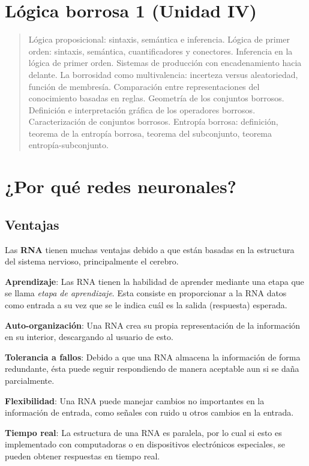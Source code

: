 \documentclass[10pt,a4paper]{article}
\begin{document}
\section*{Lógica borrosa 1 (Unidad IV)}
\begin{quote}
Lógica proposicional: sintaxis, semántica e inferencia. Lógica de primer orden: sintaxis, semántica, cuantificadores y conectores. Inferencia en la lógica de primer orden. Sistemas de producción con encadenamiento hacia delante. La borrosidad como multivalencia: incerteza versus aleatoriedad,  función de membresía. Comparación entre representaciones del conocimiento basadas en reglas. Geometría de los conjuntos borrosos. Definición e interpretación gráfica de los operadores borrosos. Caracterización de conjuntos borrosos. Entropía borrosa: definición, teorema de la entropía borrosa, teorema del subconjunto, teorema entropía-subconjunto.
\end{quote}

\pagebreak
\maketitle

\section{¿Por qué redes neuronales?}

\subsection{Ventajas}
Las \textbf{RNA} tienen muchas ventajas debido a que están basadas en la estructura del sistema nervioso, principalmente el cerebro.
\begin{description}
\item \textbf{Aprendizaje}: Las RNA tienen la habilidad de aprender mediante una etapa que se llama \textit{etapa de aprendizaje}. Esta consiste en proporcionar a la RNA datos como entrada a su vez que se le indica cuál es la salida (respuesta) esperada.
\item \textbf{Auto-organización}: Una RNA crea su propia representación de la información en su interior, descargando al usuario de esto.
\item \textbf{Tolerancia a fallos}: Debido a que una RNA almacena la información de forma redundante, ésta puede seguir respondiendo de manera aceptable aun si se daña parcialmente.
\item \textbf{Flexibilidad}: Una RNA puede manejar cambios no importantes en la información de entrada, como señales con ruido u otros cambios en la entrada.
\item \textbf{Tiempo real}: La estructura de una RNA es paralela, por lo cual si esto es implementado con computadoras o en dispositivos electrónicos especiales, se pueden obtener respuestas en tiempo real.
\end{description}
\end{document}

